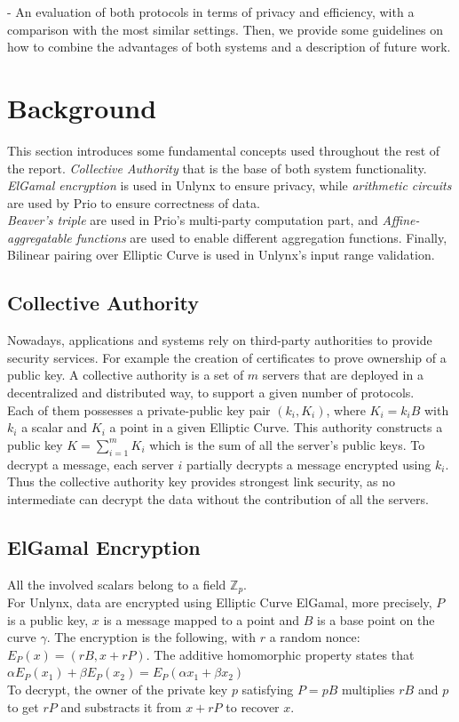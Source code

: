 \documentclass{article}
\begin{document}
- An evaluation of both protocols in terms of privacy and efficiency, with a comparison with the most similar settings. Then, we provide some guidelines on how to  combine the advantages of both systems and a description of future work.


\section{Background}
This section introduces some fundamental concepts used throughout the rest of the report. \textit{Collective Authority} that is the base of both system functionality. \textit{ElGamal encryption} is used in Unlynx to ensure privacy, while \textit{arithmetic circuits} are used by Prio to ensure correctness of data.\\
\textit{Beaver's triple} are used in Prio's multi-party computation part, and \textit{Affine-aggregatable functions} are used to enable different aggregation functions. 
Finally, Bilinear pairing over Elliptic Curve is used in Unlynx's input range validation.\\

\subsection{Collective Authority}
Nowadays, applications and systems rely on third-party authorities to provide security services. For example the creation of certificates to prove ownership of a public key. A collective authority is a set of $m$  servers that are deployed in a decentralized and distributed way, to support a given number of protocols.\\
Each of them possesses a private-public key pair $(k_i,K_i)$, where $K_i = k_i B$ with $k_i$ a scalar and $K_i$ a point in a given Elliptic Curve. This authority constructs a public key $K = \sum_{i=1}^{m}{K_i}$ which is the sum of all the server's public keys. To decrypt a message, each server $i$ partially decrypts a message encrypted using $k_{i}$. Thus the collective authority key provides strongest link security, as no intermediate can decrypt the data without the contribution of all the servers.

\subsection{ElGamal Encryption}
All the involved scalars belong to a field $\mathbb{Z}_p$.\\
For Unlynx, data are encrypted using Elliptic Curve ElGamal, more precisely, $P$ is a public key, $x$ is a message mapped to a point and $B$ is a base point on the curve $\gamma$. The encryption is the following, with $r$ a random nonce:\\
$E_P(x) = (rB,x+rP)$. The additive homomorphic property states that $\alpha E_P(x_1) + \beta E_P(x_2) = E_P(\alpha x_1+ \beta x_2)$\\
To decrypt, the owner of the private key $p$ satisfying $P = pB$ multiplies $rB$ and $p$ to get $rP$ and substracts it from $x + rP$ to recover $x$.\\
\end{document}
